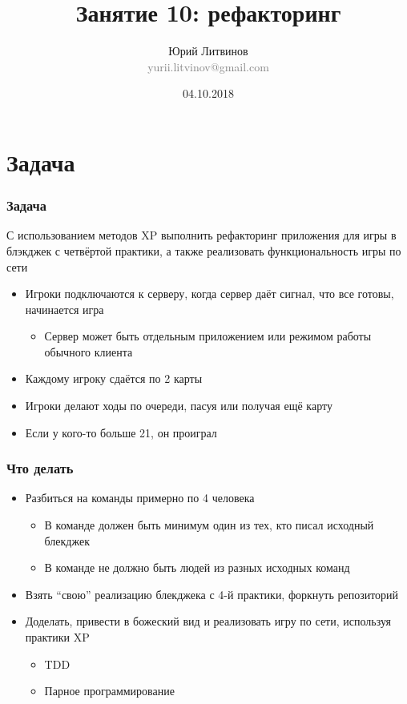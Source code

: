 \documentclass[xetex,mathserif,serif]{beamer}
\title{Занятие 10: рефакторинг}
\author[Юрий Литвинов]{Юрий Литвинов\\\small{\textcolor{gray}{yurii.litvinov@gmail.com}}}
\date{04.10.2018}
\begin{document}
	\frame{\titlepage}

	\section{Задача}

	\begin{frame}
		\frametitle{Задача}
		С использованием методов XP выполнить рефакторинг приложения для игры в блэкджек с четвёртой практики, а также реализовать функциональность игры по сети
		\begin{itemize}
			\item Игроки подключаются к серверу, когда сервер даёт сигнал, что все готовы, начинается игра
			\begin{itemize}
				\item Сервер может быть отдельным приложением или режимом работы обычного клиента
			\end{itemize}
			\item Каждому игроку сдаётся по 2 карты
			\item Игроки делают ходы по очереди, пасуя или получая ещё карту
			\item Если у кого-то больше 21, он проиграл
		\end{itemize}
	\end{frame}

	\begin{frame}
		\frametitle{Что делать}
		\begin{itemize}
			\item Разбиться на команды примерно по 4 человека
			\begin{itemize}
				\item В команде должен быть минимум один из тех, кто писал исходный блекджек
				\item В команде не должно быть людей из разных исходных команд 
			\end{itemize}
			\item Взять ``свою'' реализацию блекджека с 4-й практики, форкнуть репозиторий
			\item Доделать, привести в божеский вид и реализовать игру по сети, используя практики XP
			\begin{itemize}
				\item TDD
				\item Парное программирование
			\end{itemize}
		\end{itemize}
	\end{frame}
\end{document}
